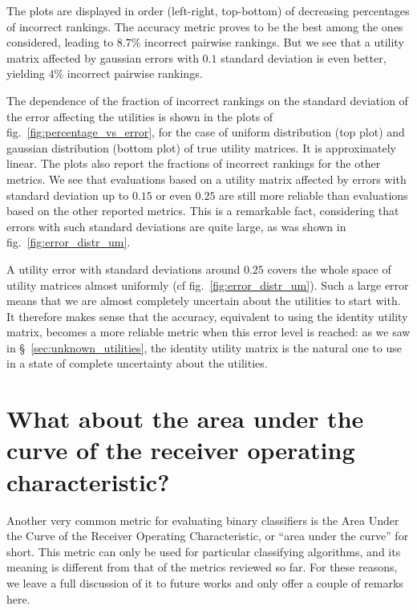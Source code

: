 \documentclass[\ifafour a4paper,12pt,\else a5paper,10pt,\fi%
onecolumn,oneside,article,%
british%
]{memoir}
\theoremstyle{remark}
\theoremstyle{innote}
\renewcommand*{\|}[1][]{\nonscript\:#1\vert\nonscript\:\mathopen{}}
\newcommand*{\sect}{\S}%
\newcommand*{\fig}{fig.}%
\begin{document}
The plots are displayed in order (left-right, top-bottom) of decreasing percentages of incorrect rankings. The accuracy metric proves to be the best among the ones considered, leading to $8.7\%$ incorrect pairwise rankings. But we see that a utility matrix affected by gaussian errors with $0.1$ standard deviation is even better, yielding $4\%$ incorrect pairwise rankings.

The dependence of the fraction of incorrect rankings on the standard deviation of the error affecting the utilities is shown in the plots of \fig~\ref{fig:percentage_vs_error}, for the case of uniform distribution (top plot) and gaussian distribution (bottom plot) of true utility matrices. It is approximately linear. The plots also report the fractions of incorrect rankings for the other metrics. We see that evaluations based on a utility matrix affected by errors with standard deviation up to $0.15$ or even $0.25$ are still more reliable than evaluations based on the other reported metrics. This is a remarkable fact, considering that errors with such standard deviations are quite large, as was shown in \fig~\ref{fig:error_distr_um}.

A utility error with standard deviations around $0.25$ covers the whole space of utility matrices almost uniformly (cf \fig~\ref{fig:error_distr_um}). Such a large error means that we are almost completely uncertain about the utilities to start with. It therefore makes sense that the accuracy, equivalent to using the identity utility matrix, becomes a more reliable metric when this error level is reached: as we saw in \sect~\ref{sec:unknown_utilities}, the identity utility matrix is the natural one to use in a state of complete uncertainty about the utilities.


\section{What about the area under the curve of the receiver operating characteristic?}
\label{sec:auc}

Another very common metric for evaluating binary classifiers is the Area Under the Curve of the Receiver Operating Characteristic, or \enquote{area under the curve} for short. This metric can only be used for particular classifying algorithms, and its meaning is different from that of the metrics reviewed so far. For these reasons, we leave a full discussion of it to future works and only offer a couple of remarks here.
\end{document}
